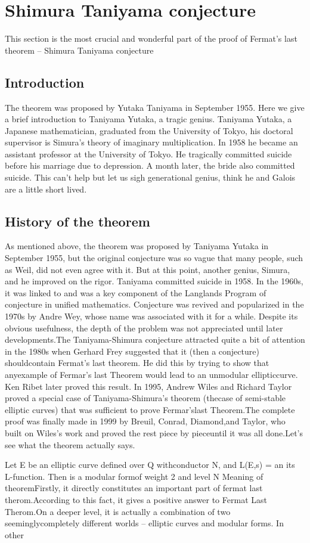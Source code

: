 \section{Shimura Taniyama conjecture}
This section is the most crucial and wonderful part of the proof of Fermat's last theorem -- Shimura Taniyama conjecture

\subsection{Introduction}
The theorem was proposed by Yutaka Taniyama in September 1955.
Here we give a brief introduction to Taniyama Yutaka, a tragic genius. Taniyama Yutaka, a Japanese mathematician, 
graduated from the University of Tokyo, his doctoral supervisor is Simura's theory of imaginary multiplication. 
In 1958 he became an assistant professor at the University of Tokyo. He tragically committed suicide before his 
marriage due to depression. A month later, the bride also committed suicide. This can't help but let us sigh 
generational genius, think he and Galois are a little short lived.
\subsection{History of the theorem}
As mentioned above, the theorem was proposed by Taniyama Yutaka 
in September 1955, but the original conjecture was so vague that many people, 
such as Weil, did not even agree with it. But at this point, another genius, Simura, and he improved on 
the rigor. Taniyama committed suicide in 1958. In the 1960s, it was linked to and was a key component of the 
Langlands Program of conjecture in unified mathematics. Conjecture was revived and popularized in the 1970s by Andre Wey, 
whose name was associated with it for a while. Despite its obvious usefulness, the depth of the problem was not appreciated until
later developments.The Taniyama-Shimura conjecture attracted quite a bit of attention in the 1980s when Gerhard 
Frey suggested that it (then a conjecture) shouldcontain Fermat's last theorem. He did this by trying to show 
that anyexample of Fermar's last Theorem would lead to an unmodular ellipticcurve. Ken Ribet later proved this result. 
In 1995, Andrew Wiles and Richard Taylor proved a special case of Taniyama-Shimura's theorem 
(thecase of semi-stable elliptic curves) that was sufficient to prove Fermar'slast Theorem.The complete 
proof was finally made in 1999 by Breuil, Conrad, Diamond,and Taylor, who built on Wiles's work and proved the 
rest piece by pieceuntil it was all done.Let's see what the theorem actually says.
\begin{theorem}
    
\end{theorem}
Let E be an elliptic curve defined over Q withconductor N, and L(E,s) =   an  
its L-function. Then  is a modular formof weight 2 and level N 
Meaning of theoremFirstly, 
it directly constitutes an important part of fermat last therom.According to this fact, 
it gives a positive answer to Fermat Last Therom.On a deeper level, 
it is actually a combination of two seeminglycompletely different worlds -- 
elliptic curves and modular forms. In other
